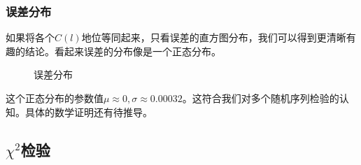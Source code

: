\documentclass[UTF8]{ctexart}
\begin{document}
	\subsubsection{误差分布}
	\begin{flushleft}
		如果将各个$C(l)$地位等同起来，只看误差的直方图分布，我们可以得到更清晰有趣的结论。看起来误差的分布像是一个正态分布。
	\end{flushleft}
	
	\begin{figure}[H]
		\centering  %
		\caption{误差分布}

	\end{figure}
	
\begin{flushleft}
		这个正态分布的参数值$\mu\approx0,\sigma\approx0.00032$。这符合我们对多个随机序列检验的认知。具体的数学证明还有待推导。
\end{flushleft}
	
	\subsection{$\chi^2$检验}
	
\end{document}
